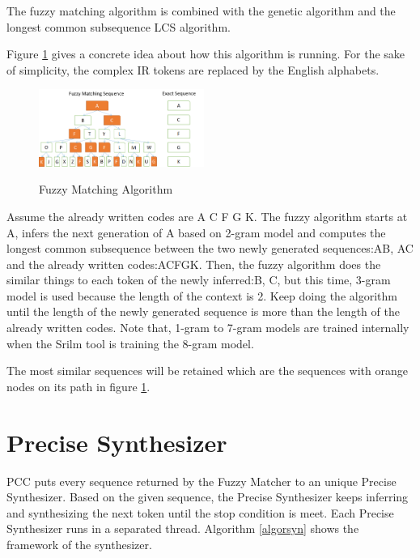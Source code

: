 \documentclass{sig-alternate-05-2015}
\begin{document}
The fuzzy matching algorithm is combined with the genetic\cite{geneticalgorithm} algorithm and the longest common subsequence LCS\cite{introalgorithm} algorithm.

Figure \ref{fuzzymatch} gives a concrete idea about how this algorithm is running. For the sake of simplicity, the complex IR tokens are replaced by the English alphabets.
\begin{figure}[htbp]
  \centering
  \includegraphics[width=0.48\textwidth]{pics/fuzzymatchshow.png}\\
  \caption{Fuzzy Matching Algorithm}\label{fuzzymatch}
\end{figure}

Assume the already written codes are A C F G K. The fuzzy algorithm starts at A, infers the next generation of A based on 2-gram model and computes the longest common subsequence between the two newly generated sequences:AB, AC and the already written codes:ACFGK. Then, the fuzzy algorithm does the similar things to each token of the newly inferred:B, C, but this time, 3-gram model is used because the length of the context is 2. Keep doing the algorithm until the length of the newly generated sequence is more than the length of the already written codes. Note that, 1-gram to 7-gram models are trained internally when the Srilm tool is training the 8-gram model.

The most similar sequences will be retained which are the sequences with orange nodes on its path in figure \ref{fuzzymatch}.

\section{Precise Synthesizer}

PCC puts every sequence returned by the Fuzzy Matcher to an unique Precise Synthesizer. Based on the given sequence, the Precise Synthesizer keeps inferring and synthesizing the next token until the stop condition is meet. Each Precise Synthesizer runs in a separated thread. Algorithm \ref{algorsyn} shows the framework of the synthesizer.
\end{document}
